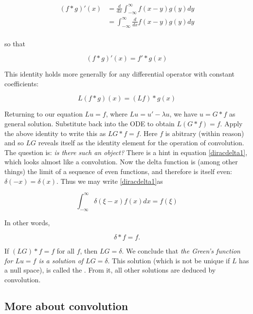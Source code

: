 \begin{align}
(f*g)'(x) &= \frac{d}{dx} \int_{-\infty}^{\infty} f(x-y)g(y)dy \\
&= \int_{-\infty}^{\infty} \frac{d}{dx}  f(x-y)g(y)dy \\
\end{align}

so that

\begin{equation}
(f*g)'(x)= f'*g(x)
\end{equation}

This identity holds more generally for any differential operator with constant coefficients:

\begin{equation}
L(f*g)(x)= (Lf)*g(x)
\end{equation}

Returning to our equation $Lu = f$, where $Lu  = u' -\lambda u$, we have $u = G*f$ as general solution.  Substitute back into the ODE to obtain $L(G*f) = f$.
Apply the above identity to write this as $LG*f = f$.
Here $f$ is abitrary (within reason) and so $LG$ reveals itself as the identity element for the operation of convolution.  The question is: \emph{is there such an object?}
There is  a hint in equation  \eqref{diracdelta1}, which looks almost like a convolution.  Now the delta function is (among other things) the limit of a sequence of even functions, and therefore is itself even: $\delta(-x) = \delta(x)$.  Thus we may write \eqref{diracdelta1}as

\begin{equation}
\label{diracdelta2}
 \int_{-\infty}^\infty \delta(\xi-x)f(x)dx =  f(\xi)
\end{equation}

In other words,

\begin{equation}
 \delta*f = f.
\end{equation}

If $(LG)* f = f$ for all $f$, then $LG = \delta$.  We conclude that \emph{the Green's function for $Lu = f$ is a solution of $LG = \delta$}.  This solution (which is not be unique if $L$ has a null space), is called the .  From it, all other solutions are deduced by convolution.


\subsection{More about convolution}

